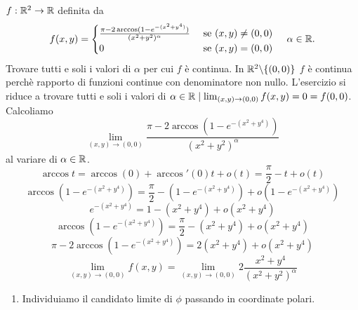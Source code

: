 

\begin{exbar}
\begin{example}
	
	$f:\mathbb{R}^2\rightarrow \mathbb{R}$ definita da 
	\begin{equation*}
		f(x,y)=\begin{cases}
			\frac{\pi-2\arccos(1-e^{-(x^2+y^4)})}{(x^2+y^2)^\alpha}&\text{  se  }(x,y)\neq (0,0)\\
			0&\text{  se  }(x,y)=(0,0) \\
		\end{cases}\,\,\,\,\,\,\,\alpha \in \mathbb{R}.
	\end{equation*}
	Trovare tutti e soli i valori di $\alpha$ per cui $f$ è continua. In $\mathbb{R}^2 \backslash\{(0,0)\}$ $f$ è continua perchè rapporto di funzioni continue con denominatore non nullo. L'esercizio si riduce a trovare tutti e soli i valori di $\alpha \in \mathbb{R} \mid \lim_{(x,y)\rightarrow(0,0)}f(x,y)=0=f(0,0)$. Calcoliamo
	\begin{equation*}
		\lim_{(x,y)\rightarrow(0,0)}  \frac{\pi-2\arccos(1-e^{-(x^2+y^4)})}{(x^2+y^2)^\alpha}
	\end{equation*}
	al variare di $\alpha \in \mathbb{R}$.\\
	\begin{equation*}
		\arccos t=\arccos(0)+\arccos'(0)t+o(t)=\frac{\pi}{2}-t+o(t)
	\end{equation*}
	\begin{equation*}
		\arccos(1-e^{-(x^2+y^4)})=\frac{\pi}{2}-(1-e^{-(x^2+y^4)})+o(1-e^{-(x^2+y^4)})
	\end{equation*}
	\begin{equation*}
		e^{-(x^2+y^4)}=1-(x^2+y^4)+o(x^2+y^4)
	\end{equation*}
	\begin{equation*}
		\arccos(1-e^{-(x^2+y^4)})=\frac{\pi}{2}-(x^2+y^4)+o(x^2+y^4)
	\end{equation*}
	\begin{equation*}
		\pi-2\arccos(1-e^{-(x^2+y^4)})=2(x^2+y^4)+o(x^2+y^4) 
	\end{equation*}
	\begin{equation*}
		\lim_{(x,y)\rightarrow(0,0)}f(x,y)=\lim_{(x,y)\rightarrow(0,0)}2\frac{x^2+y^4}{(x^2+y^2)^\alpha}
	\end{equation*}
	\begin{enumerate}
		\item Individuiamo il candidato limite di $\phi$ passando in coordinate polari.\\

\end{enumerate}
\end{example}
\end{exbar}
